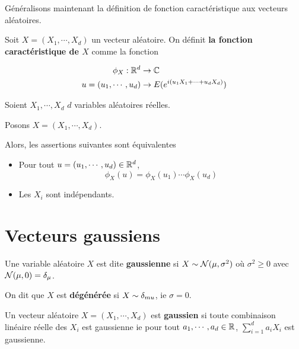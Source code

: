 Généralisons maintenant la définition de fonction caractéristique aux vecteurs
aléatoires.

\begin{definition}
	Soit $X = (X_{1}, \cdots, X_{d})$ un vecteur aléatoire.
	On définit \textbf{la fonction caractéristique de $X$} comme la fonction

	\begin{align}
		\phi_{X} : \mathbb{R}^{d} &\rightarrow \mathbb{C} \\
		u = (u_{1}, \cdots, u_{d}) &\rightarrow E(e^{i(u_{1} X_{1} + \cdots +
		u_{d} X_{d})})
		\label{equation:definition_fonction_caractéristique_vecteur}
	\end{align}
\end{definition}

\begin{theorem}
	Soient $X_{1}, \cdots, X_{d}$ $d$ variables aléatoires réelles.

	Posons $X = (X_{1}, \cdots, X_{d})$.

	Alors, les assertions suivantes sont équivalentes
	\begin{itemize}
		\item Pour tout $u = (u_{1}, \cdots, u_{d}) \in \mathbb{R}^{d}$,
				\begin{equation}
					\phi_{X}(u) = \phi_{X}(u_{1}) \cdots \phi_{X}(u_{d})
				\end{equation}
		\item Les $X_{i}$ sont indépendants.
	\end{itemize}
\end{theorem}

\section{Vecteurs gaussiens}

\begin{definition}
	Une variable aléatoire $X$ est dite \textbf{gaussienne} si $X \sim
	\mathcal{N}(\mu, \sigma^{2})$ où $\sigma^{2} \geq 0$ avec
	$\mathcal{N}(\mu, 0) = \delta_{\mu}$.

	On dit que $X$ est \textbf{dégénérée} si $X \sim \delta_{mu}$, ie
	$\sigma = 0$.
\end{definition}

\begin{definition}
	Un vecteur aléatoire $X = (X_{1}, \cdots, X_{d})$ est \textbf{gaussien} si
	toute combinaison linéaire réelle des $X_{i}$ est gaussienne ie pour tout
	$a_{1}, \cdots, a_{d} \in \mathbb{R}$, $\displaystyle \sum_{i = 1}^{d}
	a_{i}X_{i}$ est gaussienne.
\end{definition}

